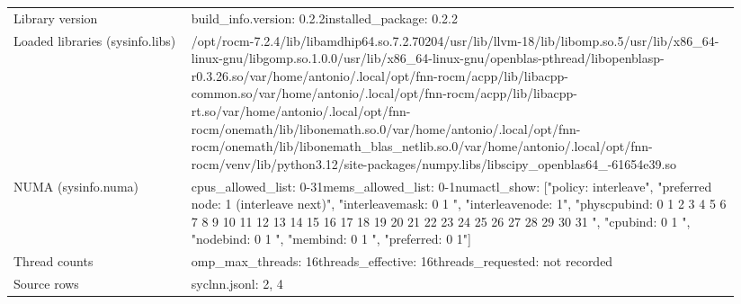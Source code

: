 \begin{longtable}{>{\raggedright\arraybackslash}p{0.23\linewidth}>{\raggedright\arraybackslash}p{0.71\linewidth}}
Library version & build\_\allowbreak{}info.version: 0.2.2\newline installed\_\allowbreak{}package: 0.2.2 \\
Loaded libraries (sysinfo.libs) & /\allowbreak{}opt/\allowbreak{}rocm-7.2.4/\allowbreak{}lib/\allowbreak{}libamdhip64.so.7.2.70204\newline /\allowbreak{}usr/\allowbreak{}lib/\allowbreak{}llvm-18/\allowbreak{}lib/\allowbreak{}libomp.so.5\newline /\allowbreak{}usr/\allowbreak{}lib/\allowbreak{}x86\_\allowbreak{}64-linux-gnu/\allowbreak{}libgomp.so.1.0.0\newline /\allowbreak{}usr/\allowbreak{}lib/\allowbreak{}x86\_\allowbreak{}64-linux-gnu/\allowbreak{}openblas-pthread/\allowbreak{}libopenblasp-r0.3.26.so\newline /\allowbreak{}var/\allowbreak{}home/\allowbreak{}antonio/\allowbreak{}.local/\allowbreak{}opt/\allowbreak{}fnn-rocm/\allowbreak{}acpp/\allowbreak{}lib/\allowbreak{}libacpp-common.so\newline /\allowbreak{}var/\allowbreak{}home/\allowbreak{}antonio/\allowbreak{}.local/\allowbreak{}opt/\allowbreak{}fnn-rocm/\allowbreak{}acpp/\allowbreak{}lib/\allowbreak{}libacpp-rt.so\newline /\allowbreak{}var/\allowbreak{}home/\allowbreak{}antonio/\allowbreak{}.local/\allowbreak{}opt/\allowbreak{}fnn-rocm/\allowbreak{}onemath/\allowbreak{}lib/\allowbreak{}libonemath.so.0\newline /\allowbreak{}var/\allowbreak{}home/\allowbreak{}antonio/\allowbreak{}.local/\allowbreak{}opt/\allowbreak{}fnn-rocm/\allowbreak{}onemath/\allowbreak{}lib/\allowbreak{}libonemath\_\allowbreak{}blas\_\allowbreak{}netlib.so.0\newline /\allowbreak{}var/\allowbreak{}home/\allowbreak{}antonio/\allowbreak{}.local/\allowbreak{}opt/\allowbreak{}fnn-rocm/\allowbreak{}venv/\allowbreak{}lib/\allowbreak{}python3.12/\allowbreak{}site-packages/\allowbreak{}numpy.libs/\allowbreak{}libscipy\_\allowbreak{}openblas64\_\allowbreak{}-61654e39.so \\
NUMA (sysinfo.numa) & cpus\_\allowbreak{}allowed\_\allowbreak{}list: 0-31\newline mems\_\allowbreak{}allowed\_\allowbreak{}list: 0-1\newline numactl\_\allowbreak{}show: ["policy: interleave", "preferred node: 1 (interleave next)", "interleavemask: 0 1 ", "interleavenode: 1", "physcpubind: 0 1 2 3 4 5 6 7 8 9 10 11 12 13 14 15 16 17 18 19 20 21 22 23 24 25 26 27 28 29 30 31 ", "cpubind: 0 1 ", "nodebind: 0 1 ", "membind: 0 1 ", "preferred: 0 1"] \\
Thread counts & omp\_\allowbreak{}max\_\allowbreak{}threads: 16\newline threads\_\allowbreak{}effective: 16\newline threads\_\allowbreak{}requested: not recorded \\
Source rows & syclnn.jsonl: 2, 4 \\
\end{longtable}
